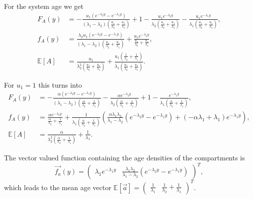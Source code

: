 \documentclass[smallextended]{svjour3}
\newcommand{\E}{\mathbb{E}}
\begin{document}
For the system age we get
\begin{align*}
    F_A(y) &= - \frac{u_{1} \left(e^{- \lambda_{2} y} - e^{- \lambda_{1} y}\right)}{\left(\lambda_{1} - \lambda_{2}\right) \left(\frac{u_{1}}{\lambda_{2}} + \frac{u_{1}}{\lambda_{1}}\right)} + 1 - \frac{u_{1} e^{- \lambda_{2} y}}{\lambda_{2} \left(\frac{u_{1}}{\lambda_{2}} + \frac{u_{1}}{\lambda_{1}}\right)} - \frac{u_{1} e^{- \lambda_{1} y}}{\lambda_{1} \left(\frac{u_{1}}{\lambda_{2}} + \frac{u_{1}}{\lambda_{1}}\right)},\\
    f_A(y) &= \frac{\lambda_{2} u_{1} \left(e^{- \lambda_{2} y} - e^{- \lambda_{1} y}\right)}{\left(\lambda_{1} - \lambda_{2}\right) \left(\frac{u_{1}}{\lambda_{2}} + \frac{u_{1}}{\lambda_{1}}\right)} + \frac{u_{1} e^{- \lambda_{2} y}}{\frac{u_{1}}{\lambda_{2}} + \frac{u_{1}}{\lambda_{1}}},\\
    \E[A] &= \frac{u_{1}}{\lambda_{2}^{2} \left(\frac{u_{1}}{\lambda_{2}} + \frac{u_{1}}{\lambda_{1}}\right)} + \frac{u_{1} \left(\frac{1}{\lambda_{2}} + \frac{1}{\lambda_{1}}\right)}{\lambda_{1} \left(\frac{u_{1}}{\lambda_{2}} + \frac{u_{1}}{\lambda_{1}}\right)}.
\end{align*}

For $u_1=1$ this turns into
\begin{align*}
    F_A(y) &= - \frac{\alpha \left(e^{- \lambda_{2} y} - e^{- \lambda_{1} y}\right)}{\left(\lambda_{1} - \lambda_{2}\right) \left(\frac{\alpha}{\lambda_{2}} + \frac{1}{\lambda_{1}}\right)} - \frac{\alpha e^{- \lambda_{2} y}}{\lambda_{2} \left(\frac{\alpha}{\lambda_{2}} + \frac{1}{\lambda_{1}}\right)} + 1 - \frac{e^{- \lambda_{1} y}}{\lambda_{1} \left(\frac{\alpha}{\lambda_{2}} + \frac{1}{\lambda_{1}}\right)},\\
    f_A(y) &= \frac{\alpha e^{- \lambda_{2} y}}{\frac{\alpha}{\lambda_{2}} + \frac{1}{\lambda_{1}}} + \frac{1}{\lambda_{1} \left(\frac{\alpha}{\lambda_{2}} + \frac{1}{\lambda_{1}}\right)} \left(\frac{\alpha \lambda_{1} \lambda_{2}}{\lambda_{1} - \lambda_{2}} \left(e^{- \lambda_{2} y} - e^{- \lambda_{1} y}\right) + \left(- \alpha \lambda_{1} + \lambda_{1}\right) e^{- \lambda_{1} y}\right),\\
    \E[A] &= \frac{\alpha}{\lambda_{2}^{2} \left(\frac{\alpha}{\lambda_{2}} + \frac{1}{\lambda_{1}}\right)} + \frac{1}{\lambda_{1}}.
\end{align*}

The vector valued function containing the age densities of the compartments is
\[
    \vec{f_a}(y) = \left(\begin{matrix}\lambda_{1} e^{- \lambda_{1} y} & \frac{\lambda_{1} \lambda_{2}}{\lambda_{1} - \lambda_{2}} \left(e^{- \lambda_{2} y} - e^{- \lambda_{1} y}\right)\end{matrix}\right)^T,
\]
which leads to the mean age vector $\E[\vec{a}] = \left(\begin{matrix}\frac{1}{\lambda_{1}} & \frac{1}{\lambda_{2}} + \frac{1}{\lambda_{1}}\end{matrix}\right)^T$.
\end{document}
